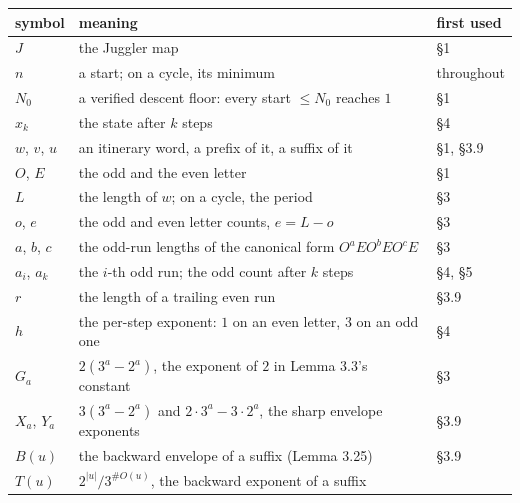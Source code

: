 \documentclass[12pt]{article}
\begin{document}
\begin{longtable}[]{@{}
  >{\raggedright\arraybackslash}p{}
  >{\raggedright\arraybackslash}p{}
  >{\raggedright\arraybackslash}p{}@{}}
\toprule\noalign{}
\begin{minipage}[b]{\linewidth}\raggedright
symbol
\end{minipage} & \begin{minipage}[b]{\linewidth}\raggedright
meaning
\end{minipage} & \begin{minipage}[b]{\linewidth}\raggedright
first used
\end{minipage} \\
\midrule\noalign{}
\endhead
\bottomrule\noalign{}
\endfoot
\bottomrule\noalign{}
\endlastfoot
\(J\) & the Juggler map & §1 \\
\(n\) & a start; on a cycle, its minimum & throughout \\
\(N_0\) & a verified descent floor: every start \(\le N_0\) reaches
\(1\) & §1 \\
\(x_k\) & the state after \(k\) steps & §4 \\
\(w\), \(v\), \(u\) & an itinerary word, a prefix of it, a suffix of it
& §1, §3.9 \\
\(O\), \(E\) & the odd and the even letter & §1 \\
\(L\) & the length of \(w\); on a cycle, the period & §3 \\
\(o\), \(e\) & the odd and even letter counts, \(e=L-o\) & §3 \\
\(a\), \(b\), \(c\) & the odd-run lengths of the canonical form
\(O^aEO^bEO^cE\) & §3 \\
\(a_i\), \(a_k\) & the \(i\)-th odd run; the odd count after \(k\) steps
& §4, §5 \\
\(r\) & the length of a trailing even run & §3.9 \\
\(h\) & the per-step exponent: \(1\) on an even letter, \(3\) on an odd
one & §4 \\
\(G_a\) & \(2(3^a-2^a)\), the exponent of \(2\) in Lemma 3.3's constant
& §3 \\
\(X_a\), \(Y_a\) & \(3(3^a-2^a)\) and \(2\cdot3^a-3\cdot2^a\), the sharp
envelope exponents & §3.9 \\
\(B(u)\) & the backward envelope of a suffix (Lemma 3.25) & §3.9 \\
\(T(u)\) & \(2^{|u|}/3^{\#O(u)}\), the backward exponent of a suffix &

\end{longtable}
\end{document}

